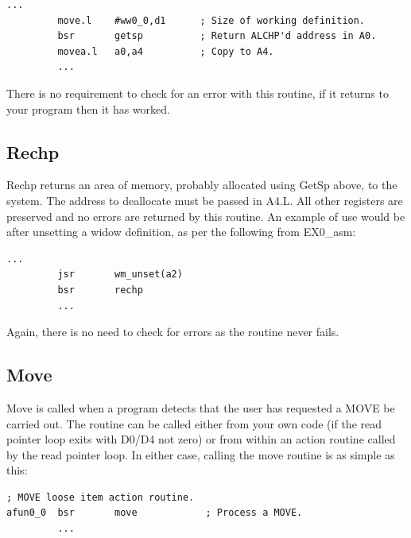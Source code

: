 \begin{lstlisting}[firstnumber=1,caption={EasyPEasy - GetSP Example},label={lst:EasyPeasyGetSPExample}]
         ...
         move.l    #ww0_0,d1      ; Size of working definition.
         bsr       getsp          ; Return ALCHP'd address in A0.
         movea.l   a0,a4          ; Copy to A4.
         ...
\end{lstlisting}

There is no requirement to check for an error with this routine, if it
            returns to your program then it has worked.

\subsection{Rechp}
\label{ch26-sub-rechp}%

Rechp returns an area of memory, probably allocated using GetSp above,
            to the system. The address to deallocate must be passed in A4.L. All other
            registers are preserved and no errors are returned by this routine. An example
            of use would be after unsetting a widow definition, as per the following from
 EX0\_asm:

\begin{lstlisting}[firstnumber=1,caption={EasyPEasy - Rechp Example},label={lst:EasyPeasyRechpExample}]
         ...
         jsr       wm_unset(a2)
         bsr       rechp
         ...
\end{lstlisting}

Again, there is no need to check for errors as the routine never
            fails.

\subsection{Move}
\label{ch26-sub-move}%

Move is called when a program detects that the user has requested a MOVE
            be carried out. The routine can be called either from your own code (if the
            read pointer loop exits with D0/D4 not zero) or from within an action routine
            called by the read pointer loop. In either case, calling the move routine is
            as simple as this:

\begin{lstlisting}[firstnumber=1,caption={EasyPEasy - Move Example},label={lst:EasyPeasyMoveExample}]
; MOVE loose item action routine.         
afun0_0  bsr       move            ; Process a MOVE.
         ...
\end{lstlisting}

